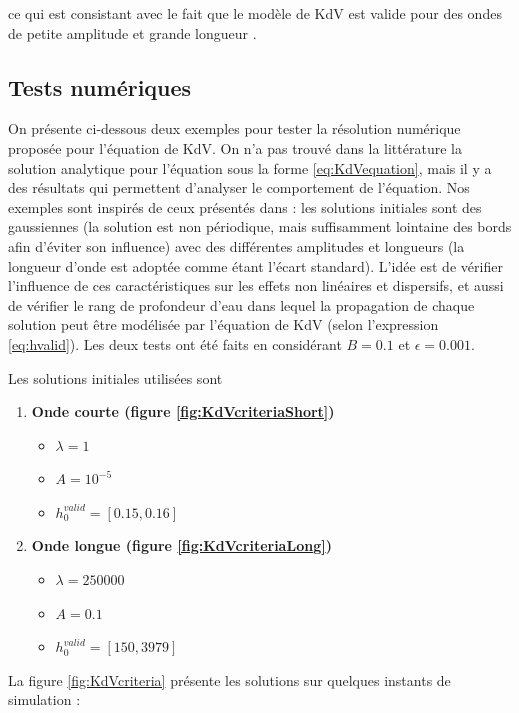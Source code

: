 \noindent ce qui est consistant avec le fait que le modèle de KdV est valide pour des ondes de petite amplitude et grande longueur \cite{BBM1971}.

\subsection{Tests numériques}

\indent On présente ci-dessous deux exemples pour tester la résolution numérique proposée pour l'équation de KdV. On n'a pas trouvé dans la littérature la solution analytique pour l'équation sous la forme \eqref{eq:KdVequation}, mais il y a des résultats qui permettent d'analyser le comportement de l'équation. Nos exemples sont inspirés de ceux présentés dans \cite{conservationLaws2002}: les solutions initiales sont des gaussiennes (la solution est non périodique, mais suffisamment lointaine des bords afin d'éviter son influence) avec des différentes amplitudes et longueurs (la longueur d'onde est adoptée comme étant l'écart standard). L'idée est de vérifier l'influence de ces caractéristiques sur les effets non linéaires et dispersifs, et aussi de vérifier le rang de profondeur d'eau dans lequel la propagation de chaque solution peut être modélisée par l'équation de KdV (selon l'expression \ref{eq:hvalid}). Les deux tests ont été faits en considérant $B = 0.1$ et $\epsilon = 0.001$.

\indent Les solutions initiales utilisées sont

\begin{enumerate}
	\item \textbf{Onde courte (figure \ref{fig:KdVcriteriaShort})} %
		\begin{itemize}
			\item $\lambda = 1$
			\item $ A = 10^{-5}$
			\item $ h_0^{valid} = [0.15, 0.16] $
		\end{itemize}
	\item \textbf{Onde longue (figure \ref{fig:KdVcriteriaLong})} %
		\begin{itemize}
			\item $\lambda = 250000$
			\item $ A = 0.1$
			\item $ h_0^{valid} = [150, 3979] $
		\end{itemize}
\end{enumerate}

\indent La figure \ref{fig:KdVcriteria} présente les solutions sur quelques instants de simulation :

